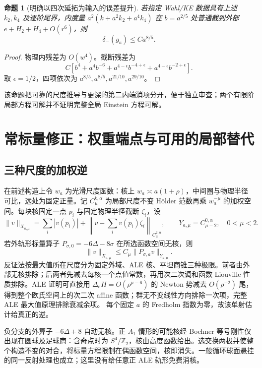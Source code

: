 \documentclass[UTF8,fontset=fandol,zihao=-4,oneside,openany]{ctexbook}
\theoremstyle{cjkplain}
\newtheorem{proposition}[theorem]{命题}
\numberwithin{equation}{chapter}
\begin{document}
\begin{proposition}[明确以四次延拓为输入的误差提升]\label{FND:quarticbound}
若指定 Wahl/KE 数据具有上述 \(k_2,k_4\) 及逐阶尾界，内度量
\(a^2(k+a^2k_2+a^4k_4)\) 在 \(b=a^{2/5}\) 处普通截到外部 \(e+H_2+H_4+O(r^6)\)，则
\[
\delta_-(g_a)\le Ca^{8/5}.
\]
\end{proposition}
\begin{proof}
物理内残差为 \(O(w^4)\)。截断残差为
\[
C\left[b^4+a^4b^{-6}
+a^{4-\epsilon}b^{-4+\epsilon}
+a^{4-\epsilon}b^{-2+\epsilon}\right].
\]
取 \(\epsilon=1/2\)，四项依次为
\(a^{8/5},a^{8/5},a^{21/10},a^{29/10}\)。
\end{proof}
该命题把可靠的尺度推导与更深的第二内端消项分开，便于独立审查；两个有限阶局部方程可解并不证明完整全局 Einstein 方程可解。

\section{常标量修正：权重端点与可用的局部替代}
\subsection{三种尺度的加权逆}
在前述构造上令 \(w_a\) 为光滑尺度函数：核上 \(w_a\asymp a(1+\rho)\)，中间圈与物理半径可比，远处为固定正量。记 \(C^{k,\alpha}_\mu\) 为局部尺度不变 Hölder 范数再乘 \(w_a^{-\mu}\) 的加权空间。每块核固定一点 \(p_i\) 与固定物理半径截断 \(\zeta_i\)，设
\[
\|v\|_{X_{a,\mu}}=\sum_i|v(p_i)|
+\left\|v-\sum_iv(p_i)\zeta_i\right\|_{C^{2,\alpha}_\mu},
\qquad Y_{a,\mu}=C^{0,\alpha}_{\mu-2},\quad0<\mu<2.
\]
若外轨形标量算子 \(P_{\sigma,0}=-6\Delta-8\sigma\) 在所选函数空间无核，则
\begin{equation}\label{FND:weightedscalar}
\|v\|_{X_{a,\mu}}\le C_\mu\|P_{\sigma,a}v\|_{Y_{a,\mu}} .
\end{equation}
反证法按最大值所在尺度分为固定外域、ALE 核、平坦商锥三种极限。前者由外部无核排除；后两者先减去每核一个点值常数，再用次二次调和函数 Liouville 性质排除。ALE 证明可直接用
\(\Delta_eH=O(\rho^{\mu-6})\) 的 Newton 势减去 \(O(\rho^{-2})\) 尾，得到整个欧氏空间上的次二次 affine 函数；群无不变线性方向排除一次项，完整 ALE 最大值原理排除衰减余项。
每个固定 \(a\) 的 Fredholm 指数为零，故该单射估计给真正的逆。

负分支的外算子 \(-6\Delta+8\) 自动无核。正 \(A_1\) 情形的可能核经 Bochner 等号刚性仅出现在圆球及足球商：含奇点时为 \(S^4/\mathbb Z_2\)，核由高度函数给出。选交换两极并使整个构造不变的对合，将标量方程限制在偶函数空间，核即消失。一般循环球面悬挂的同一反射处理也成立；这里没有给任意正 ALE 轨形免费消核。
\end{document}
